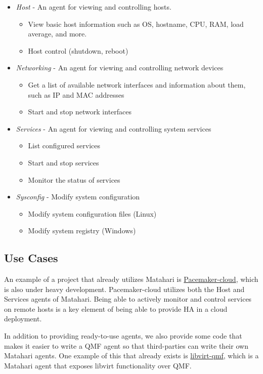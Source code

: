\begin{itemize}

    \item \emph{Host} - An agent for viewing and controlling hosts.
    \begin{itemize}
        \item View basic host information such as OS, hostname, CPU, RAM, load average, and more.
        \item Host control (shutdown, reboot) 
    \end{itemize}

    \item \emph{Networking} - An agent for viewing and controlling network devices
    \begin{itemize}
        \item Get a list of available network interfaces and information about them, such as IP and MAC addresses
        \item Start and stop network interfaces 
    \end{itemize}

    \item \emph{Services} - An agent for viewing and controlling system services
    \begin{itemize}
        \item List configured services
        \item Start and stop services
        \item Monitor the status of services 
    \end{itemize}

    \item \emph{Sysconfig} - Modify system configuration
    \begin{itemize}
        \item Modify system configuration files (Linux)
        \item Modify system registry (Windows) 
    \end{itemize}

\end{itemize}

\subsection{Use Cases}

An example of a project that already utilizes Matahari is \href{http://pacemaker-cloud.org/}{Pacemaker-cloud}, which is also under heavy development. Pacemaker-cloud utilizes both the Host and Services agents of Matahari. Being able to actively monitor and control services on remote hosts is a key element of being able to provide HA in a cloud deployment.

In addition to providing ready-to-use agents, we also provide some code that makes it easier to write a QMF agent so that third-parties can write their own Matahari agents. One example of this that already exists is \href{http://libvirt.org/}{libvirt-qmf}, which is a Matahari agent that exposes libvirt functionality over QMF. 


